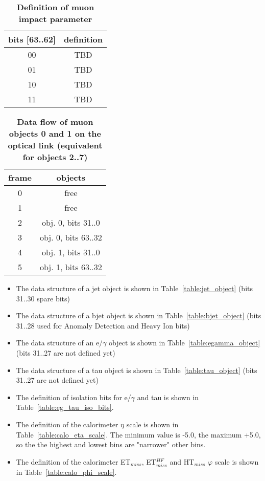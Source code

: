 \documentclass{cmspaper}
\begin{document}
\begin{table}[ht]
\caption{\bf Definition of muon impact parameter}
\vspace{5mm}
\centering
\begin{tabular}{|c|c|}\hline
bits [63..62] & definition \\\hline\hline
00 & TBD \\
01 & TBD \\
10 & TBD \\
11 & TBD \\\hline
\end{tabular}
\label{table:muon_iso_bits}
\end{table}

\begin{table}[ht]
\caption{\bf Data flow of muon objects 0 and 1 on the optical link \rm(equivalent for objects 2..7)}
\vspace{5mm}
\centering
\begin{tabular}{|c|c|}\hline
frame & objects\\\hline\hline
0 & free \\\hline
1 & free \\\hline
2 & obj. 0, bits 31..0\\\hline
3 & obj. 0, bits 63..32 \\\hline
4 & obj. 1, bits 31..0 \\\hline
5 & obj. 1, bits 63..32 \\\hline
\end{tabular}
\label{table:opt_link_muon_obj_0_1}
\end{table}

\clearpage

\begin{itemize}
\item The data structure of a jet object is shown in Table~\ref{table:jet_object} (bits 31..30 spare bits)
\item The data structure of a bjet object is shown in Table~\ref{table:bjet_object} (bits 31..28 used for Anomaly Detection and Heavy Ion bits)
\item The data structure of an e/$\gamma$ object is shown in Table~\ref{table:egamma_object} (bits 31..27 are not defined yet)
\item The data structure of a tau object is shown in Table~\ref{table:tau_object} (bits 31..27 are not defined yet)
\item The definition of isolation bits for e/$\gamma$ and tau is shown in Table~\ref{table:eg_tau_iso_bits}.
\item The definition of the calorimeter $\eta$ scale is shown in Table~\ref{table:calo_eta_scale}. The minimum value is -5.0, the maximum +5.0, so the the highest and lowest
bins are "narrower" other bins.
\item The definition of the calorimeter ET$_{miss}$, ET$_{miss}^{HF}$ and HT$_{miss}$ $\varphi$ scale is shown in Table~\ref{table:calo_phi_scale}.
\end{itemize}
\end{document}
